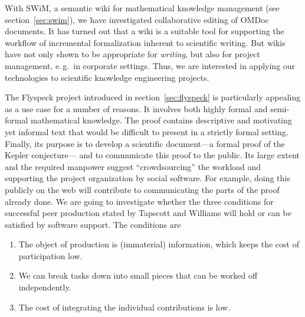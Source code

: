 With SWiM, a semantic wiki for mathematical knowledge management (see
section~\ref{sec:swim}), we have investigated collaborative editing of OMDoc documents.
It has turned out that a wiki is a suitable tool for supporting the workflow of
incremental formalization inherent to scientific writing.  But wikis have not only shown
to be appropriate for \emph{writing}, but also for project management, e.\,g.\ in
corporate settings\cite{leuf01:wikiway}.  Thus, we are interested in applying our
technologies to scientific knowledge engineering projects.  

The Flyspeck project
introduced in section~\ref{sec:flyspeck} is particularly appealing as a use case
for a number of reasons. It
involves both highly formal and semi-formal mathematical knowledge.   
The proof contains descriptive and motivating yet informal text that would
be difficult to present in a strictly formal setting.
Finally, its purpose is to develop a scientific document---a formal proof of the Kepler
conjecture--- and to communicate this proof to the public.  Its large extent and the
required manpower suggest ``crowdsourcing'' the workload and supporting the project
organization by social software.  For example, doing this publicly on the web will contribute to
communicating the parts of the proof already done.  We are going to investigate whether
the three conditions for successful peer production stated by Tapscott and
Williams\cite{wikinomics} will hold or can be satisfied by software support.
The conditions are
\begin{enumerate} 
\item The object of production is (immaterial) information, which
  keeps the cost of participation low.
\item We can break tasks down into small pieces that can be worked
  off independently.
\item The cost of integrating the individual contributions is low.
\end{enumerate} 


